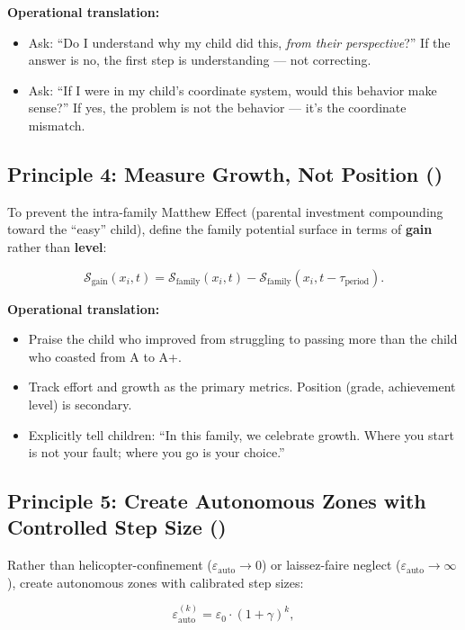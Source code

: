 \documentclass[11pt,a4paper]{article}
\newcommand{\cS}{\mathcal{S}}
\begin{document}
\textbf{Operational translation:}
\begin{itemize}
    \item Ask: ``Do I understand why my child did this, \textit{from their perspective}?'' If the answer is no, the first step is understanding — not correcting.
    \item Ask: ``If I were in my child's coordinate system, would this behavior make sense?'' If yes, the problem is not the behavior — it's the coordinate mismatch.
\end{itemize}

\subsection{Principle 4: Measure Growth, Not Position ()}

To prevent the intra-family Matthew Effect (parental investment compounding toward the ``easy'' child), define the family potential surface in terms of \textbf{gain} rather than \textbf{level}:

\begin{equation}
    \cS_{\text{gain}}(x_i, t) = \cS_{\text{family}}(x_i, t) - \cS_{\text{family}}(x_i, t - \tau_{\text{period}}).
\end{equation}

\textbf{Operational translation:}
\begin{itemize}
    \item Praise the child who improved from struggling to passing more than the child who coasted from A to A+.
    \item Track effort and growth as the primary metrics. Position (grade, achievement level) is secondary.
    \item Explicitly tell children: ``In this family, we celebrate growth. Where you start is not your fault; where you go is your choice.''
\end{itemize}

\subsection{Principle 5: Create Autonomous Zones with Controlled Step Size ()}

Rather than helicopter-confinement ($\varepsilon_{\text{auto}} \to 0$) or laissez-faire neglect ($\varepsilon_{\text{auto}} \to \infty$), create autonomous zones with calibrated step sizes:

\begin{equation}
    \varepsilon_{\text{auto}}^{(k)} = \varepsilon_0 \cdot (1 + \gamma)^k,
\end{equation}
\end{document}
